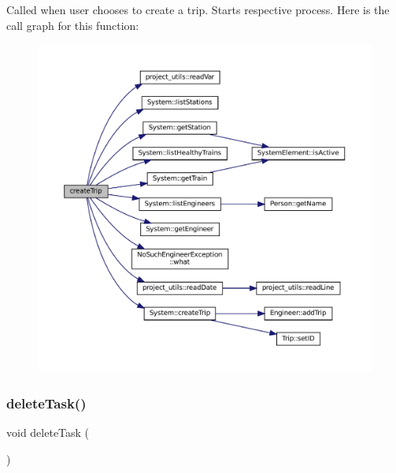 Called when user chooses to create a trip. Starts respective process. Here is the call graph for this function\+:
\nopagebreak
\begin{figure}[H]
\begin{center}
\leavevmode
\includegraphics[width=350pt]{Train-System_8cpp_ad4041e4e0eaf523f74477b7d0409d493_cgraph}
\end{center}
\end{figure}
\mbox{\label{Train-System_8cpp_a707ef45664b3d98b60124d73406d1d7e}} 
\subsubsection{\texorpdfstring{delete\+Task()}{deleteTask()}}
{\footnotesize\ttfamily void delete\+Task (\begin{DoxyParamCaption}{ }\end{DoxyParamCaption})}


